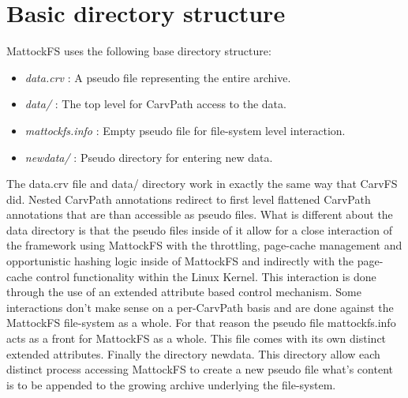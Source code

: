 \section{Basic directory structure}
MattockFS uses the following base directory structure:
\begin{itemize}
\item \emph{data.crv} : A pseudo file representing the entire archive.
\item \emph{data/} : The top level for CarvPath access to the data.
\item \emph{mattockfs.info} : Empty pseudo file for file-system level interaction.
\item \emph{newdata/} : Pseudo directory for entering new data.
\end{itemize}
The data.crv file and data/ directory work in exactly the same way that CarvFS did. Nested CarvPath annotations redirect to first level flattened CarvPath annotations that are than accessible as pseudo files. What is different about the data directory is that the pseudo files inside of it allow for a close interaction of the framework using MattockFS with the throttling, page-cache management and opportunistic hashing logic inside of MattockFS and indirectly with the page-cache control functionality within the Linux Kernel. This interaction is done through the use of an extended attribute based control mechanism. Some interactions don't make sense on a per-CarvPath basis and are done against the MattockFS file-system as a whole. For that reason the pseudo file mattockfs.info acts as a front for MattockFS as a whole. This file comes with its own distinct extended attributes. Finally the directory newdata. This directory allow each distinct process accessing MattockFS to create a new pseudo file what's content is to be appended to the growing archive underlying the file-system. 
